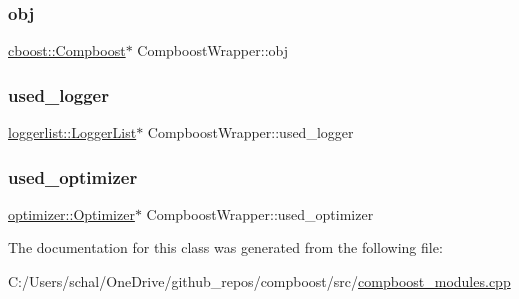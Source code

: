 \mbox{\label{class_compboost_wrapper_aa8050a2356bd99b89f829b0eabdf975c}} 
\subsubsection{\texorpdfstring{obj}{obj}}
{\footnotesize\ttfamily \mbox{\hyperlink{classcboost_1_1_compboost}{cboost\+::\+Compboost}}$\ast$ Compboost\+Wrapper\+::obj\hspace{0.3cm}{\ttfamily [private]}}

\mbox{\label{class_compboost_wrapper_afb5bff8581d3b9d9f8c0665a5ef5c028}} 
\subsubsection{\texorpdfstring{used\+\_\+logger}{used\_logger}}
{\footnotesize\ttfamily \mbox{\hyperlink{classloggerlist_1_1_logger_list}{loggerlist\+::\+Logger\+List}}$\ast$ Compboost\+Wrapper\+::used\+\_\+logger\hspace{0.3cm}{\ttfamily [private]}}

\mbox{\label{class_compboost_wrapper_a14f682d0b5d9260ee1c84d09e5c26a9c}} 
\subsubsection{\texorpdfstring{used\+\_\+optimizer}{used\_optimizer}}
{\footnotesize\ttfamily \mbox{\hyperlink{classoptimizer_1_1_optimizer}{optimizer\+::\+Optimizer}}$\ast$ Compboost\+Wrapper\+::used\+\_\+optimizer\hspace{0.3cm}{\ttfamily [private]}}



The documentation for this class was generated from the following file\+:\begin{DoxyCompactItemize}
\item 
C\+:/\+Users/schal/\+One\+Drive/github\+\_\+repos/compboost/src/\mbox{\hyperlink{compboost__modules_8cpp}{compboost\+\_\+modules.\+cpp}}\end{DoxyCompactItemize}

